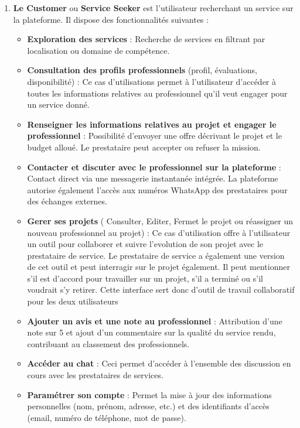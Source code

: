 \begin{enumerate}
    \item \textbf{Le Customer} ou \textbf{Service Seeker} est l’utilisateur recherchant un service sur la plateforme. Il dispose des fonctionnalités suivantes : 
    \vspace{0.39cm}
        \begin{itemize}
            \item \textbf{Exploration des services} : Recherche de services en filtrant par localisation ou domaine de compétence. 
            \item \textbf{Consultation des profils professionnels} (profil, évaluations, disponibilité) : Ce cas d'utilisations permet à l'utilisateur d'accéder à toutes les informations relatives au professionnel qu'il  veut engager pour un service donné.
            \item \textbf{Renseigner les informations relatives au projet et engager le professionnel} : Possibilité d’envoyer une offre décrivant le projet et le budget alloué. Le prestataire peut accepter ou refuser la mission.
            \item \textbf{Contacter et discuter avec le professionnel sur la plateforme} : Contact direct via une messagerie instantanée intégrée. La plateforme autorise également l’accès aux numéros WhatsApp des prestataires pour des échanges externes.
            \item \textbf{Gerer ses projets} ( Consulter, Editer, Fermet le projet ou réassigner un nouveau professionnel au projet) : Ce cas d'utilisation offre à l'utilisateur un outil pour collaborer et suivre l'evolution de son projet avec le prestataire de service. Le prestataire de service a également une version de cet outil et peut interragir sur le projet également. Il peut mentionner s'il est d'accord pour travailler sur un projet, s'il a terminé ou s'il voudrait s'y retirer. Cette interface sert donc d'outil de travail collaboratif pour les deux utilisateurs
            \item \textbf{Ajouter un avis et une note au professionnel} : Attribution d’une note sur 5 et ajout d’un commentaire sur la qualité du service rendu, contribuant au classement des professionnels.
            \item \textbf{Accéder au chat} : Ceci permet d'accéder à l'ensemble des discussion en cours avec les prestataires de services.
            \item \textbf{Paramétrer son compte} : Permet la mise à jour des informations personnelles (nom, prénom, adresse, etc.) et des identifiants d’accès (email, numéro de téléphone, mot de passe).
        \end{itemize}


\end{enumerate}
